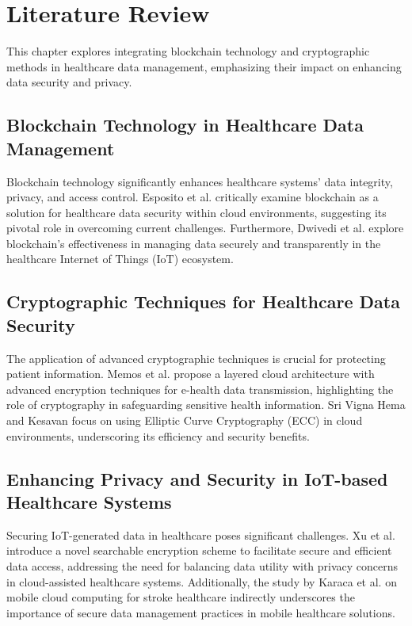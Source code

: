 \documentclass[cic,tc,english]{iiufrgs}
\begin{document}
\chapter{Literature Review}

This chapter explores integrating blockchain technology and cryptographic methods in healthcare data management, emphasizing their impact on enhancing data security and privacy.

\section{Blockchain Technology in Healthcare Data Management}
Blockchain technology significantly enhances healthcare systems' data integrity, privacy, and access control. Esposito et al. \cite{Esposito2018} critically examine blockchain as a solution for healthcare data security within cloud environments, suggesting its pivotal role in overcoming current challenges. Furthermore, Dwivedi et al. \cite{Dwivedi2019} explore blockchain's effectiveness in managing data securely and transparently in the healthcare Internet of Things (IoT) ecosystem.

\section{Cryptographic Techniques for Healthcare Data Security}
The application of advanced cryptographic techniques is crucial for protecting patient information. Memos et al. \cite{Memos2021} propose a layered cloud architecture with advanced encryption techniques for e-health data transmission, highlighting the role of cryptography in safeguarding sensitive health information. Sri Vigna Hema and Kesavan \cite{sri2019} focus on using Elliptic Curve Cryptography (ECC) in cloud environments, underscoring its efficiency and security benefits.

\section{Enhancing Privacy and Security in IoT-based Healthcare Systems}
Securing IoT-generated data in healthcare poses significant challenges. Xu et al. \cite{Xu2019} introduce a novel searchable encryption scheme to facilitate secure and efficient data access, addressing the need for balancing data utility with privacy concerns in cloud-assisted healthcare systems. Additionally, the study by Karaca et al. \cite{Karaca2019} on mobile cloud computing for stroke healthcare indirectly underscores the importance of secure data management practices in mobile healthcare solutions.
\end{document}
